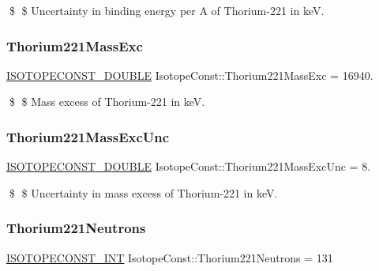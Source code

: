 \$ \$ Uncertainty in binding energy per A of Thorium-\/221 in keV. \mbox{\label{group___isotope_const-_thorium-_th221_ga0a4a3d7901fde00b03f41519f055cfaf}} 
\subsubsection{\texorpdfstring{Thorium221\+Mass\+Exc}{Thorium221MassExc}}
{\footnotesize\ttfamily \mbox{\hyperlink{group___isotope_const-_macros_ga8f45a7272ce02c0b4c65c44636ed719a}{I\+S\+O\+T\+O\+P\+E\+C\+O\+N\+S\+T\+\_\+\+D\+O\+U\+B\+LE}} Isotope\+Const\+::\+Thorium221\+Mass\+Exc = 16940.}

\$ \$ Mass excess of Thorium-\/221 in keV. \mbox{\label{group___isotope_const-_thorium-_th221_ga5dac61788bb5156e59d0ef80743ae3b7}} 
\subsubsection{\texorpdfstring{Thorium221\+Mass\+Exc\+Unc}{Thorium221MassExcUnc}}
{\footnotesize\ttfamily \mbox{\hyperlink{group___isotope_const-_macros_ga8f45a7272ce02c0b4c65c44636ed719a}{I\+S\+O\+T\+O\+P\+E\+C\+O\+N\+S\+T\+\_\+\+D\+O\+U\+B\+LE}} Isotope\+Const\+::\+Thorium221\+Mass\+Exc\+Unc = 8.}

\$ \$ Uncertainty in mass excess of Thorium-\/221 in keV. \mbox{\label{group___isotope_const-_thorium-_th221_ga111623f307c9415fbc4229be749dba63}} 
\subsubsection{\texorpdfstring{Thorium221\+Neutrons}{Thorium221Neutrons}}
{\footnotesize\ttfamily \mbox{\hyperlink{group___isotope_const-_macros_ga5f18360b3e99483a35c32d789e62621c}{I\+S\+O\+T\+O\+P\+E\+C\+O\+N\+S\+T\+\_\+\+I\+NT}} Isotope\+Const\+::\+Thorium221\+Neutrons = 131}

